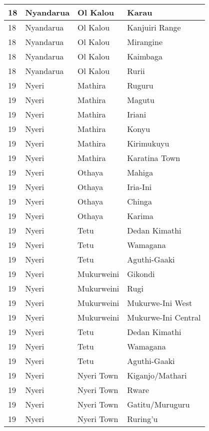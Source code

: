 \begin{table}[!ht]
\begin{tabular}{|l|l|l|l|}
        18 & Nyandarua & Ol Kalou & Karau \\ \hline
        18 & Nyandarua & Ol Kalou & Kanjuiri Range \\ \hline
        18 & Nyandarua & Ol Kalou & Mirangine \\ \hline
        18 & Nyandarua & Ol Kalou & Kaimbaga \\ \hline
        18 & Nyandarua & Ol Kalou & Rurii \\ \hline
        19 & Nyeri & Mathira & Ruguru \\ \hline
        19 & Nyeri & Mathira & Magutu \\ \hline
        19 & Nyeri & Mathira & Iriani \\ \hline
        19 & Nyeri & Mathira & Konyu \\ \hline
        19 & Nyeri & Mathira & Kirimukuyu \\ \hline
        19 & Nyeri & Mathira & Karatina Town \\ \hline
        19 & Nyeri & Othaya & Mahiga \\ \hline
        19 & Nyeri & Othaya & Iria-Ini \\ \hline
        19 & Nyeri & Othaya & Chinga \\ \hline
        19 & Nyeri & Othaya & Karima \\ \hline
        19 & Nyeri & Tetu & Dedan Kimathi \\ \hline
        19 & Nyeri & Tetu & Wamagana \\ \hline
        19 & Nyeri & Tetu & Aguthi-Gaaki \\ \hline
        19 & Nyeri & Mukurweini & Gikondi \\ \hline
        19 & Nyeri & Mukurweini & Rugi \\ \hline
        19 & Nyeri & Mukurweini & Mukurwe-Ini West \\ \hline
        19 & Nyeri & Mukurweini & Mukurwe-Ini Central \\ \hline
        19 & Nyeri & Tetu & Dedan Kimathi \\ \hline
        19 & Nyeri & Tetu & Wamagana \\ \hline
        19 & Nyeri & Tetu & Aguthi-Gaaki \\ \hline
        19 & Nyeri & Nyeri Town & Kiganjo/Mathari \\ \hline
        19 & Nyeri & Nyeri Town & Rware \\ \hline
        19 & Nyeri & Nyeri Town & Gatitu/Muruguru \\ \hline
        19 & Nyeri & Nyeri Town & Ruring’u \\ \hline

\end{tabular}
\end{table}

